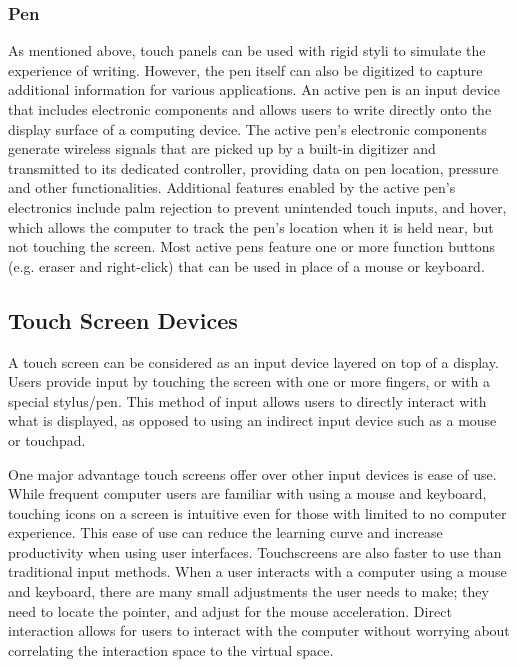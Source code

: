 \documentclass[11pt]{report}
\begin{document}
 \subsubsection{Pen}
 
 As mentioned above, touch panels can be used with rigid styli to simulate the experience of writing. 
 However, the pen itself can also be digitized to capture additional information for various applications. 
 An active pen is an input device that includes electronic components and allows users to write directly onto the display surface of a computing device.
 The active pen's electronic components generate wireless signals that are picked up by a built-in digitizer and transmitted to its dedicated controller, providing data on pen location, pressure and other functionalities. 
 Additional features enabled by the active pen's electronics include palm rejection to prevent unintended touch inputs, and hover, which allows the computer to track the pen's location when it is held near, but not touching the screen. 
 Most active pens feature one or more function buttons (e.g. eraser and right-click) that can be used in place of a mouse or keyboard.

\subsection{Touch Screen Devices}

A touch screen can be considered as an input device layered on top of a display. 
Users provide input by touching the screen with one or more fingers, or with a special stylus/pen.
This method of input allows users to directly interact with what is displayed, as opposed to using an indirect input device such as a mouse or touchpad.

One major advantage touch screens offer over other input devices is ease of use.
While frequent computer users are familiar with using a mouse and keyboard, touching icons on a screen is intuitive even for those with limited to no computer experience.
This ease of use can reduce the learning curve and increase productivity when using user interfaces.
Touchscreens are also faster to use than traditional input methods.
When a user interacts with a computer using a mouse and keyboard, there are many small adjustments the user needs to make; they need to locate the pointer, and adjust for the mouse acceleration.
Direct interaction allows for users to interact with the computer without worrying about correlating the interaction space to the virtual space. 
\end{document}
